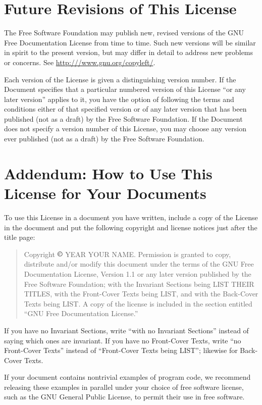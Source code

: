 \section{Future Revisions of This License}

The Free Software Foundation may publish new, revised versions of
the GNU Free Documentation License from time to time. Such new versions
will be similar in spirit to the present version, but may differ in
detail to address new problems or concerns. See \url{http:///www.gnu.org/copyleft/}.

Each version of the License is given a distinguishing version number.
If the Document specifies that a particular numbered version of this
License ``or any later version'' applies to it, you have the option
of following the terms and conditions either of that specified version
or of any later version that has been published (not as a draft) by
the Free Software Foundation. If the Document does not specify a version
number of this License, you may choose any version ever published
(not as a draft) by the Free Software Foundation.

\section{Addendum: How to Use This License for Your Documents}

To use this License in a document you have written, include a copy
of the License in the document and put the following copyright and
license notices just after the title page:
\begin{quote}
Copyright $\copyright$ YEAR YOUR NAME. Permission is granted to copy,
distribute and/or modify this document under the terms of the GNU
Free Documentation License, Version 1.1 or any later version published
by the Free Software Foundation; with the Invariant Sections being
LIST THEIR TITLES, with the Front-Cover Texts being LIST, and with
the Back-Cover Texts being LIST. A copy of the license is included
in the section entitled ``GNU Free Documentation License.''
\end{quote}
If you have no Invariant Sections, write ``with no Invariant Sections''
instead of saying which ones are invariant. If you have no Front-Cover
Texts, write ``no Front-Cover Texts'' instead of ``Front-Cover
Texts being LIST''; likewise for Back-Cover Texts.

If your document contains nontrivial examples of program code, we
recommend releasing these examples in parallel under your choice of
free software license, such as the GNU General Public License, to
permit their use in free software.

